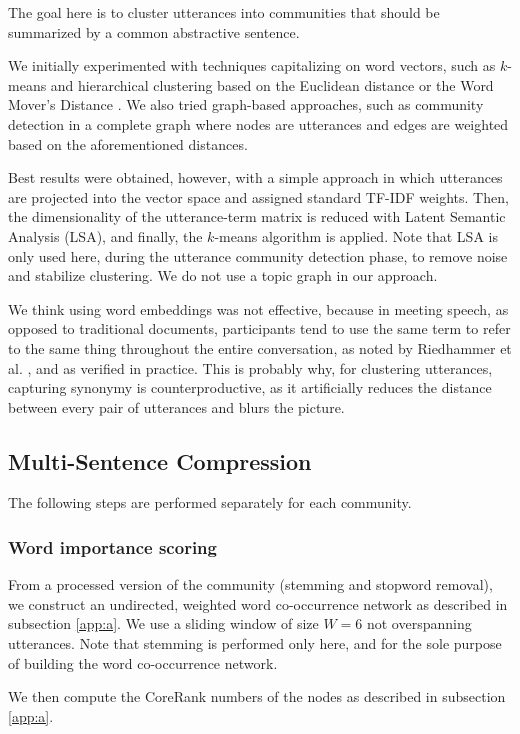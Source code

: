 \documentclass[11pt,a4paper]{article}
\begin{document}
The goal here is to cluster utterances into communities that should be summarized by a common abstractive sentence. 

We initially experimented with techniques capitalizing on word vectors, such as $k$-means and hierarchical clustering based on the Euclidean distance or the Word Mover's Distance \cite{kusner2015word}. We also tried graph-based approaches, such as community detection in a complete graph where nodes are utterances and edges are weighted based on the aforementioned distances.

Best results were obtained, however, with a simple approach in which utterances are projected into the vector space and assigned standard TF-IDF weights. Then, the dimensionality of the utterance-term matrix is reduced with Latent Semantic Analysis (LSA), and finally, the $k$-means algorithm is applied. Note that LSA is only used here, during the utterance community detection phase, to remove noise and stabilize clustering. We do not use a topic graph in our approach.

We think using word embeddings was not effective, because in meeting speech, as opposed to traditional documents, participants tend to use the same term to refer to the same thing throughout the entire conversation, as noted by Riedhammer et al. , and as verified in practice. This is probably why, for clustering utterances, capturing synonymy is counterproductive, as it artificially reduces the distance between every pair of utterances and blurs the picture.
\subsection{Multi-Sentence Compression} \label{subsec:msc}
The following steps are performed separately for each community.

\subsubsection*{Word importance scoring}\label{subsub:deg}
From a processed version of the community (stemming and stopword removal), we construct an undirected, weighted word co-occurrence network as described in subsection \ref{app:a}. We use a sliding window of size $W=6$ not overspanning utterances. Note that stemming is performed only here, and for the sole purpose of building the word co-occurrence network.

We then compute the CoreRank numbers of the nodes as described in subsection \ref{app:a}.
\end{document}
